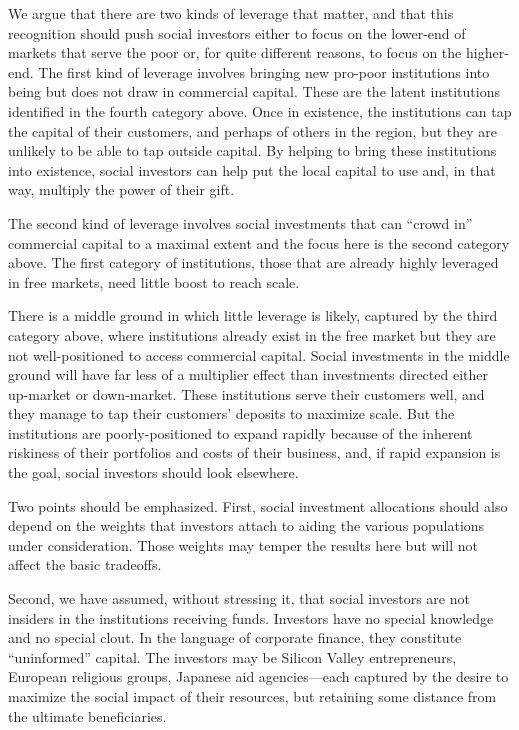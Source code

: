 \documentclass[letterpaper, 12pt]{article}
\begin{document}
We argue that there are two kinds of leverage that matter, and that this
recognition should push social investors either to focus on the
lower-end of markets that serve the poor or, for quite different
reasons, to focus on the higher-end. The first kind of leverage involves
bringing new pro-poor institutions into being but does not draw in
commercial capital. These are the latent institutions identified in the
fourth category above. Once in existence, the institutions can tap the
capital of their customers, and perhaps of others in the region, but
they are unlikely to be able to tap outside capital. By helping to bring
these institutions into existence, social investors can help put the
local capital to use and, in that way, multiply the power of their gift.

The second kind of leverage involves social investments that can ``crowd
in'' commercial capital to a maximal extent and the focus here is the
second category above. The first category of institutions, those that
are already highly leveraged in free markets, need little boost to reach
scale.

There is a middle ground in which little leverage is likely, captured by
the third category above, where institutions already exist in the free
market but they are not well-positioned to access commercial capital.
Social investments in the middle ground will have far less of a
multiplier effect than investments directed either up-market or
down-market. These institutions serve their customers well, and they
manage to tap their customers' deposits to maximize scale. But the
institutions are poorly-positioned to expand rapidly because of the
inherent riskiness of their portfolios and costs of their business, and,
if rapid expansion is the goal, social investors should look elsewhere.

Two points should be emphasized. First, social investment allocations
should also depend on the weights that investors attach to aiding the
various populations under consideration. Those weights may temper the
results here but will not affect the basic tradeoffs.

Second, we have assumed, without stressing it, that social investors are
not insiders in the institutions receiving funds. Investors have no
special knowledge and no special clout. In the language of corporate
finance, they constitute ``uninformed'' capital. The investors may be
Silicon Valley entrepreneurs, European religious groups, Japanese aid
agencies---each captured by the desire to maximize the social impact of
their resources, but retaining some distance from the ultimate
beneficiaries.
\end{document}
